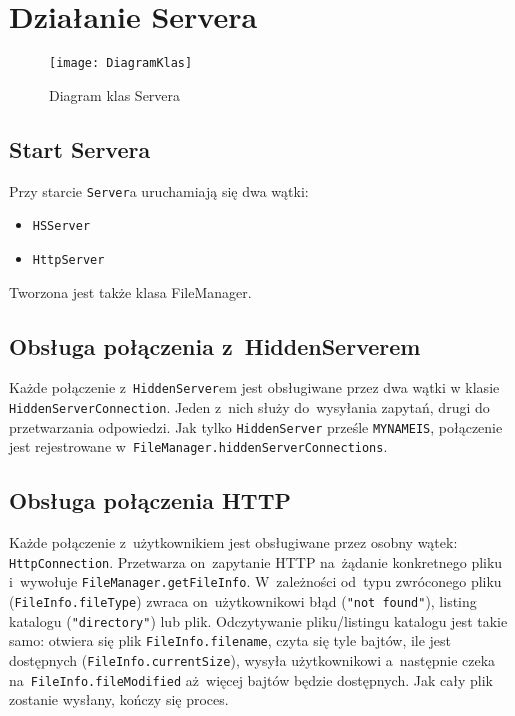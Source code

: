 \documentclass[a4paper,notitlepage]{article}
\begin{document}
\pagestyle{fancy}
\tableofcontents
\section{Działanie Servera}
\begin{figure}
\texttt{[image: DiagramKlas]}
\caption{Diagram klas Servera}
\end{figure}
\subsection{Start Servera}
Przy starcie \verb!Server!a uruchamiają się dwa wątki: 
\begin{itemize}
\item \verb!HSServer!
\item \verb!HttpServer!
\end{itemize}
Tworzona jest także klasa FileManager.

\subsection{Obsługa połączenia z~HiddenServerem}
Każde połączenie z~\verb!HiddenServer!em jest obsługiwane przez 
dwa wątki w klasie \verb!HiddenServerConnection!. Jeden z~nich służy 
do~wysyłania zapytań, drugi do przetwarzania odpowiedzi.
Jak tylko \verb!HiddenServer! prześle \verb!MYNAMEIS!,
połączenie jest rejestrowane w~\verb!FileManager.hiddenServerConnections!.

\subsection{Obsługa połączenia HTTP}
Każde połączenie z~użytkownikiem jest obsługiwane przez osobny wątek: 
\verb!HttpConnection!. Przetwarza on~zapytanie HTTP na~żądanie konkretnego
pliku i~wywołuje \verb!FileManager.getFileInfo!. W~zależności od~typu zwróconego
pliku (\verb!FileInfo.fileType!) zwraca on~użytkownikowi błąd 
(\verb!"not found"!), listing katalogu (\verb!"directory"!) lub plik.
Odczytywanie pliku/listingu katalogu jest takie samo:
otwiera się plik \verb!FileInfo.filename!, czyta się tyle bajtów, ile jest
dostępnych (\verb!FileInfo.currentSize!), wysyła użytkownikowi a~następnie czeka
na~\verb!FileInfo.fileModified! aż~więcej bajtów będzie dostępnych. Jak cały 
plik zostanie wysłany, kończy się proces.
\end{document}
